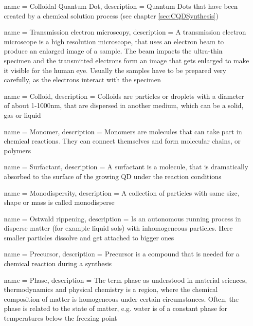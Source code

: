 
	{
	name				=	{Colloidal Quantum Dot},
	description	=	{Quantum Dots that have been created  by a chemical solution process (see chapter \ref{sec:CQDSynthesis})}
	}

	{
	name				= {Transmission electron microscopy},
	description	= {A transmission electron microscope is a high resolution microscope, that uses an electron beam to produce an
								 enlarged image of a sample. The beam impacts the ultra-thin specimen and the transmitted electrons form an image
								 that gets enlarged to make it visible for the human eye. Usually the samples have to be prepared very carefully,
								 as the electrons interact with the specimen}
	}
	
	{
	name				= {Colloid},
	description	= {Colloids are particles or droplets with a diameter of about 1-1000nm, that are dispersed in another medium,
								 which can be a solid, gas or liquid}
	}
	
	{
	name				= {Monomer},
	description	= {Monomers are molecules that can take part in chemical reactions. They can connect themselves and form molecular chains,
								 or polymers}
	}
	
	{
	name				= {Surfactant},
	description	= {A surfactant is a molecule, that is dramatically absorbed to the surface of the growing \gls{QD} under the reaction conditions \cite{Schmid}}
	}
	
	{
	name				= {Monodispersity},
	description	= {A collection of particles with same size, shape or mass is called monodisperse}
	}
	
	{
	name				= {Ostwald rippening},
	description	= {Is an autonomous running process in disperse matter (for example liquid sols) with inhomogeneous particles.
								 Here smaller particles dissolve and get attached to bigger ones}
	}
	
	{
	name				= {Precursor},
	description	= {Precursor is a compound that is needed for a chemical reaction during a synthesis}
	}
	
	{
	name				= {Phase},
	description	= {The term phase as understood in material sciences, thermodynamics and physical chemistry is a region, where the chemical composition
								 of matter is homogeneous under certain circumstances.
								 Often, the phase is related to the state of matter, e.g. water is of a constant phase for temperatures below the freezing point}
	}
	
